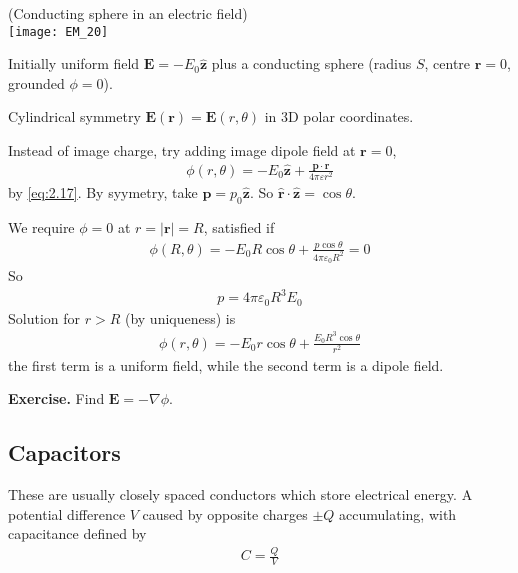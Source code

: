 \documentclass[a4paper]{article}
\begin{document}
\begin{eg} (Conducting sphere in an electric field)\\

\texttt{[image: EM\_20]}

Initially uniform field $\mathbf{E} = -E_0 \hat{\mathbf{z}}$ plus a conducting sphere (radius $S$, centre $\mathbf{r}=0$, grounded $\phi = 0$).

Cylindrical symmetry $\mathbf{E}(\mathbf{r}) = \mathbf{E}(r,\theta)$ in 3D polar coordinates.

Instead of image charge, try adding image dipole field at $\mathbf{r}=0$,
\begin{equation*}
\begin{aligned}
\phi(r,\theta) = -E_0 \hat{\mathbf{z}} + \frac{\mathbf{p} \cdot \mathbf{r}}{4\pi \varepsilon r^2}
\end{aligned}
\end{equation*}
by \eqref{eq:2.17}. By syymetry, take $\mathbf{p} = p_0 \hat{\mathbf{z}}$. So $\hat{\mathbf{r}} \cdot \hat{\mathbf{z}} = \cos \theta$.

We require $\phi=0$ at $r = |\mathbf{r}| = R$, satisfied if
\begin{equation*}
\begin{aligned}
\phi(R,\theta) = -E_0 R\cos\theta + \frac{p\cos\theta}{4\pi \varepsilon_0 R^2} = 0
\end{aligned}
\end{equation*}
So 
\begin{equation*}
\begin{aligned}
p = 4\pi\varepsilon_0 R^3 E_0
\end{aligned}
\end{equation*}
Solution for $r>R$ (by uniqueness) is
\begin{equation*}
\begin{aligned}
\phi(r,\theta) = -E_0 r \cos\theta + \frac{E_0 R^3 \cos\theta}{r^2}
\end{aligned}
\end{equation*}
the first term is a uniform field, while the second term is a dipole field.
\end{eg}

\textbf{Exercise.} Find $\mathbf{E} = -\nabla \phi$.

\subsection{Capacitors}
These are usually closely spaced conductors which store electrical energy. A potential difference $V$ caused by opposite charges $\pm Q$ accumulating, with capacitance defined by
\begin{equation*}\tag{2.32} \label{eq:2.32}
\begin{aligned}
C=\frac{Q}{V}
\end{aligned}
\end{equation*}
\end{document}
